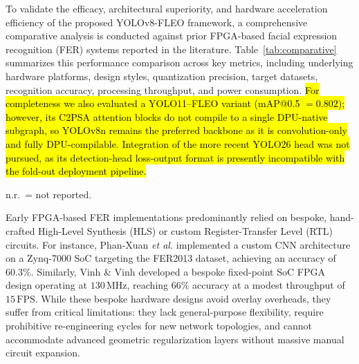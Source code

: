 \documentclass[algorithms,article,submit,moreauthors]{Definitions/mdpi}
\newcommand{\rev}[1]{\hl{#1}}
\begin{document}
To validate the efficacy, architectural superiority, and hardware acceleration efficiency of the proposed YOLOv8-FLEO framework, a comprehensive comparative analysis is conducted against prior FPGA-based facial expression recognition (FER) systems reported in the literature. Table~\ref{tab:comparative} summarizes this performance comparison across key metrics, including underlying hardware platforms, design styles, quantization precision, target datasets, recognition accuracy, processing throughput, and power consumption. \rev{For completeness we also evaluated a YOLO11--FLEO variant (mAP@0.5 \mbox{$=0.802$}); however, its C2PSA attention blocks do not compile to a single DPU-native subgraph, so YOLOv8n remains the preferred backbone as it is convolution-only and fully DPU-compilable. Integration of the more recent YOLO26 head was not pursued, as its detection-head loss-output format is presently incompatible with the fold-out deployment pipeline.}

\begin{table}[h!]
\centering
\caption{Comparative Study with prior FPGA-based facial expression recognition systems.}
\label{tab:comparative}
\begin{tablenotes}[flushleft]\footnotesize
\item n.r.\ = not reported.
\end{tablenotes}
\end{table}

Early FPGA-based FER implementations predominantly relied on bespoke, hand-crafted High-Level Synthesis (HLS) or custom Register-Transfer Level (RTL) circuits. For instance, Phan-Xuan \textit{et al.}\citep{bib12} implemented a custom CNN architecture on a Zynq-7000 SoC targeting the FER2013 dataset, achieving an accuracy of $60.3\%$. Similarly, Vinh \& Vinh \citep{bib13} developed a bespoke fixed-point SoC FPGA design operating at $130\,\text{MHz}$, reaching $66\%$ accuracy at a modest throughput of $15\,\text{FPS}$. While these bespoke hardware designs avoid overlay overheads, they suffer from critical limitations: they lack general-purpose flexibility, require prohibitive re-engineering cycles for new network topologies, and cannot accommodate advanced geometric regularization layers without massive manual circuit expansion.
\end{document}
